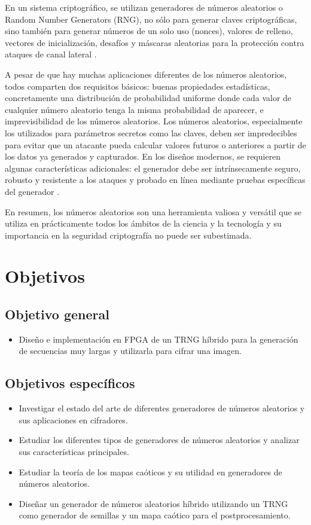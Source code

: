     En un sistema criptográfico, se utilizan generadores de números aleatorios o Random Number Generators (RNG), no sólo para generar claves criptográficas, sino también para generar números de un solo uso (nonces), valores de relleno, vectores de inicialización, desafíos y máscaras aleatorias para la protección contra ataques de canal lateral \cite{Petura2016}.

    A pesar de que hay muchas aplicaciones diferentes de los números aleatorios, todos comparten dos requisitos básicos: buenas propiedades estadísticas, concretamente una distribución de probabilidad uniforme donde cada valor de cualquier número aleatorio tenga la misma probabilidad de aparecer, e imprevisibilidad de los números aleatorios. Los números aleatorios, especialmente los utilizados para parámetros secretos como las claves, deben ser impredecibles para evitar que un atacante pueda calcular valores futuros o anteriores a partir de los datos ya generados y capturados. En los diseños modernos, se requieren algunas características adicionales: el generador debe ser intrínsecamente seguro, robusto y resistente a los ataques y probado en línea mediante pruebas específicas del generador \cite{Badrignans2011}. 

    En resumen, los números aleatorios son una herramienta valiosa y versátil que se utiliza en prácticamente todos los ámbitos de la ciencia y la tecnología y su importancia en la seguridad criptografía no puede ser subestimada.		
	
\cite{Jun1999}

	\section{Objetivos}
	
		\subsection{Objetivo general}
			\begin{itemize}
				\item Diseño e implementación en FPGA de un TRNG híbrido para la generación de secuencias muy largas y utilizarla para cifrar una imagen.
			\end{itemize}
		
		\subsection{Objetivos específicos}
			\begin{itemize}
                \item Investigar el estado del arte de diferentes generadores de números aleatorios y sus aplicaciones en cifradores.
                \item Estudiar los diferentes tipos de generadores de números aleatorios y analizar sus características principales.
                \item Estudiar la teoría de los mapas caóticos y su utilidad en generadores de números aleatorios.
                \item Diseñar un generador de números aleatorios híbrido utilizando un TRNG como generador de semillas y un mapa caótico para el postprocesamiento.
			\end{itemize}
